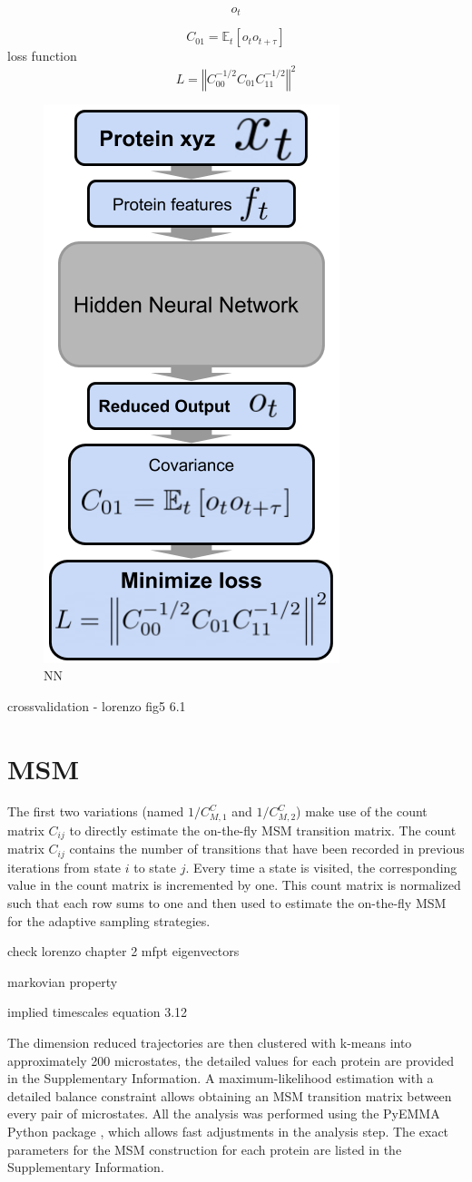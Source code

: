 $$o_{t}$$

$$C_{01}=\ensuremath{\mathbb{E}}_{t}\left[o_{t}o_{t+\tau}\right]$$
loss function
$$L=\left\Vert C_{00}^{-1/2}C_{01}C_{11}^{-1/2}\right\Vert ^{2}$$

\begin{figure}[H]
  \centering
  \includegraphics[width=0.4\linewidth]{figures3/NN.png}
  \caption{NN}
  \label{fig:NN}
\end{figure}


crossvalidation  - lorenzo fig5 6.1


\section{MSM}

The first two variations (named $1/C_{M,1}^C$ and $1/C_{M,2}^C$) make use of the count
matrix $C_{ij}$ to directly estimate the on-the-fly MSM transition matrix. The count matrix
$C_{ij}$ contains the number of transitions that have been recorded in previous
iterations from state $i$ to state $j$. Every time a state is visited, the corresponding value
in the count matrix is incremented by one. This count matrix is normalized such
that each row sums to one and then used to estimate the on-the-fly MSM for the
adaptive sampling strategies.


check  lorenzo chapter 2
mfpt
eigenvectors

markovian property

implied timescales equation 3.12


The dimension reduced trajectories are then clustered with k-means into approximately 200 microstates,
the detailed values for each protein are provided in the Supplementary Information. 
A  maximum-likelihood estimation with a detailed balance
constraint \cite{prinz2011markov} allows obtaining an MSM transition matrix 
between every pair of microstates. All the analysis was
performed using the PyEMMA Python package \cite{scherer2015pyemma}, which
allows fast adjustments in the analysis step. The exact parameters for the MSM
construction for each protein are listed in the
Supplementary Information.


